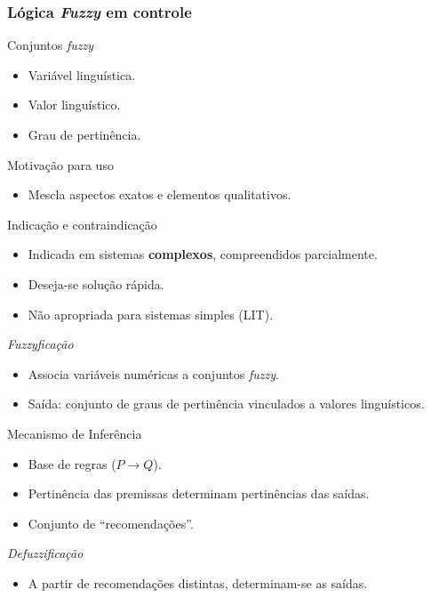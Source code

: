 \begin{frame}
	\frametitle{Lógica \textit{Fuzzy} em controle}
	\vspace{-0.1cm}
	\begin{block}{Conjuntos \textit{fuzzy}}
		\begin{itemize}
		  \item Variável linguística.
		  \item Valor linguístico.
		  \item Grau de pertinência.
		\end{itemize}
	\end{block}	
	\pause
	\begin{exampleblock}{Motivação para uso}
		\begin{itemize}
		  \item Mescla aspectos exatos e elementos qualitativos.
		\end{itemize}
	\end{exampleblock}
	\pause
	\begin{block}{Indicação e contraindicação}
		\begin{itemize}
		  \item Indicada em sistemas \textbf{complexos}, compreendidos parcialmente.
		  \item Deseja-se solução rápida.
		  \item Não apropriada para sistemas simples (LIT).
		\end{itemize}
	\end{block}
\end{frame}

\begin{frame}
	
\end{frame}

\begin{frame}
	\begin{block}{\textit{Fuzzyficação}}
		\begin{itemize}
		  \item Associa variáveis numéricas a conjuntos \textit{fuzzy}.
		  \item Saída: conjunto de graus de pertinência vinculados a valores
		  linguísticos.
		\end{itemize}
	\end{block}
	\pause
	\begin{exampleblock}{Mecanismo de Inferência}
		\begin{itemize}
		  \item Base de regras ($P \rightarrow Q$).
		  \item Pertinência das premissas determinam pertinências das saídas.
		  \item Conjunto de ``recomendações''.
		\end{itemize}
	\end{exampleblock}
	\pause
	\begin{block}{\textit{Defuzzificação}}
		\begin{itemize}
		  \item A partir de recomendações distintas, determinam-se as saídas.
		\end{itemize}
	\end{block}
\end{frame}

